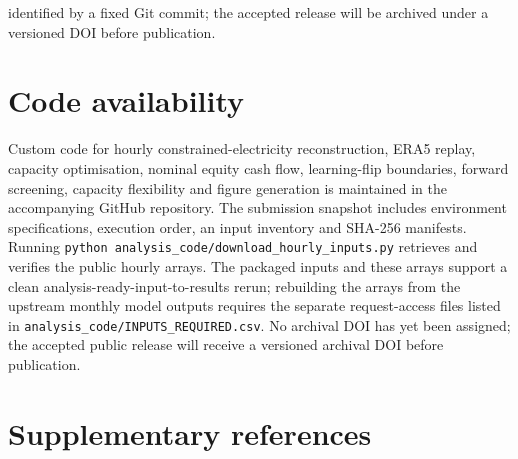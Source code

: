 \documentclass[pdflatex,sn-nature]{sn-jnl}
\begin{document}
identified by a fixed Git commit; the accepted release will be archived under a versioned DOI before publication.

\section*{Code availability}

Custom code for hourly constrained-electricity reconstruction, ERA5 replay, capacity optimisation, nominal equity cash flow, learning-flip boundaries, forward screening, capacity flexibility and figure generation is maintained in the accompanying GitHub repository. The submission snapshot includes environment specifications, execution order, an input inventory and SHA-256 manifests. Running \texttt{python analysis\_code/download\_hourly\_inputs.py} retrieves and verifies the public hourly arrays. The packaged inputs and these arrays support a clean analysis-ready-input-to-results rerun; rebuilding the arrays from the upstream monthly model outputs requires the separate request-access files listed in \texttt{analysis\_code/INPUTS\_REQUIRED.csv}. No archival DOI has yet been assigned; the accepted public release will receive a versioned archival DOI before publication.

\section*{Supplementary references}
\end{document}
